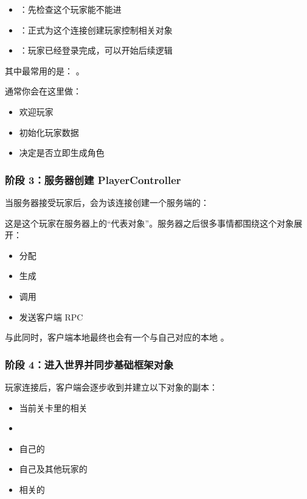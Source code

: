 \begin{itemize}
	\item {}：先检查这个玩家能不能进
	\item {}：正式为这个连接创建玩家控制相关对象
	\item {}：玩家已经登录完成，可以开始后续逻辑
\end{itemize}
其中最常用的是：
。

通常你会在这里做：
\begin{itemize}
	\item 欢迎玩家
	\item 初始化玩家数据
	\item 决定是否立即生成角色
\end{itemize}

\subsubsection{阶段 3：服务器创建 PlayerController}
当服务器接受玩家后，会为该连接创建一个服务端的：

这是这个玩家在服务器上的“代表对象”。服务器之后很多事情都围绕这个对象展开：
\begin{itemize}
	\item 分配 
	\item 生成 
	\item 调用 
	\item 发送客户端 RPC
\end{itemize}

与此同时，客户端本地最终也会有一个与自己对应的本地 。



\subsubsection{阶段 4：进入世界并同步基础框架对象}
玩家连接后，客户端会逐步收到并建立以下对象的副本：

\begin{itemize}
	\item 当前关卡里的相关 
	\item {}
	\item 自己的 
	\item 自己及其他玩家的 
	\item 相关的 
\end{itemize}

